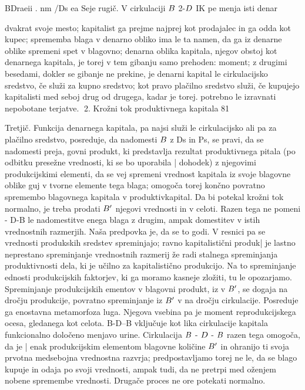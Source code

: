 \documentclass[kapital_02.tex]{subfiles}
\begin{document}
BDraeii . nm /Ds ea Seje rugič. V cirkulaciji \( B \) 2-\( D \) IK pe menja isti denar

dvakrat svoje mesto; kapitalist ga prejme najprej kot prodajalec in ga odda kot kupec; sprememba blaga v denarno obliko ima le ta namen, da ga iz denarne oblike spremeni spet v blagovno; denarna oblika kapitala, njegov obstoj kot denarnega kapitala, je torej v tem gibanju samo prehoden: moment; z drugimi besedami, dokler se gibanje ne prekine, je denarni kapital le cirkulacijsko sredstvo, če služi za kupno sredstvo; kot pravo plačilno sredstvo služi, če kupujejo kapitalisti med seboj drug od drugega, kadar je torej. potrebno le izravnati nepobotane terjatve. 2. Krožni tok produktivnega kapitala 81



 Tretjič. Funkcija denarnega kapitala, pa najsi služi le cirkulacijsko ali pa za plačilno sredstvo, posreduje, da nadomesti \( B \) z Ds in Ps, se pravi, da se nadomesti preja, govni produkt, ki predstavlja rezultat produktivnega pitala (po odbitku presežne vrednosti, ki se bo uporabila | dohodek) z njegovimi produkcijskimi elementi, da se vej spremeni vrednost kapitala iz svoje blagovne oblike guj v tvorne elemente tega blaga; omogoča torej končno povratno spremembo blagovnega kapitala v produktivkapital. Da bi potekal krožni tok normalno, je treba prodati \( B' \) njegovi vrednosti in v celoti. Razen tega ne pomeni - D-B le nadomestitve enega blaga z drugim, ampak domestitev v istih vrednostnih razmerjih. Naša predpovka je, da se to godi. V resnici pa se vrednosti produkskih sredstev spreminjajo; ravno kapitalistični produk| je lastno neprestano spreminjanje vrednostnih razmerij že radi stalnega spreminjanja produktivnosti dela, ki je učilno za kapitalistično produkcijo. Na to spreminjanje ednosti produkcijskih faktorjev, ki ga moramo kasneje zložiti, tu le opozarjamo. Spreminjanje produkcijskih ementov v blagovni produkt, iz \KPEP v \( B' \), se dogaja na dročju produkcije, povratno spreminjanje iz \( B' \) v \KPEP na dročju cirkulacije. Posreduje ga enostavna metamorfoza luga. Njegova vsebina pa je moment reprodukcijskega ocesa, gledanega kot celota. B-D--B vključuje kot lika cirkulacije kapitala funkcionalno določeno menjavo urine. Cirkulacija \( B \) - \( D \) - \( B \) razen tega omogoča, da je | enak produkcijskim elementom blagovne količine \( B' \) in ohranijo ti svoja prvotna medsebojna vrednostna razvrja; predpostavljamo torej ne le, da se blago kupuje in odaja po svoji vrednosti, ampak tudi, da ne pretrpi med oženjem nobene spremembe vrednosti. Drugače proces ne ore potekati normalno.
\end{document}
